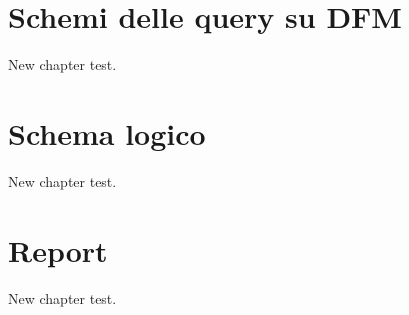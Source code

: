 \documentclass[12pt,a4paper,openright,oneside]{report}
\renewcommand{\chaptermark}[1]{\markboth{\thechapter.\ #1}{}}
\begin{document}
	\clearpage{\pagestyle{empty}\cleardoublepage}
	\chapter{Schemi delle query su DFM}                %
	\lhead[\fancyplain{}{\bfseries\thepage}]{\fancyplain{}{\bfseries\rightmark}}
	New chapter test.
	
	\clearpage{\pagestyle{empty}\cleardoublepage}
	\chapter{Schema logico}           %
	\lhead[\fancyplain{}{\bfseries\thepage}]{\fancyplain{}{\bfseries\rightmark}}
	New chapter test.
	
	\clearpage{\pagestyle{empty}\cleardoublepage}
	\chapter{Report}           %
	\lhead[\fancyplain{}{\bfseries\thepage}]{\fancyplain{}{\bfseries\rightmark}}
	New chapter test.
	
	
	\renewcommand{\chaptermark}[1]{\markright{\thechapter \ #1}{}}
	\lhead[\fancyplain{}{\bfseries\thepage}]{\fancyplain{}{\bfseries\rightmark}}
	
	
\end{document}
